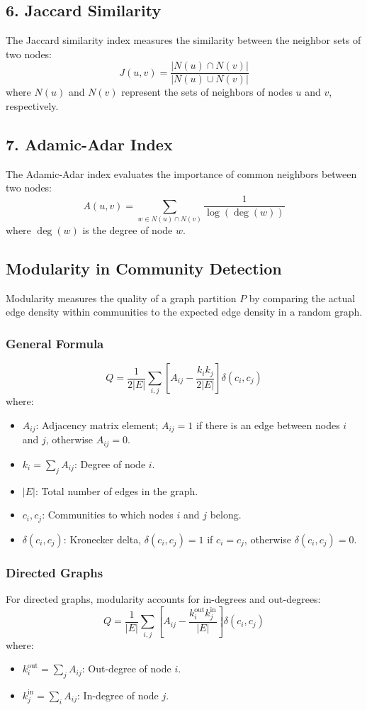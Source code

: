 \documentclass[12pt, a4paper,oneside]{book}
\begin{document}
\subsection*{6. Jaccard Similarity}
The Jaccard similarity index measures the similarity between the neighbor sets of two nodes:
\[
J(u, v) = \frac{|N(u) \cap N(v)|}{|N(u) \cup N(v)|}
\]
where \( N(u) \) and \( N(v) \) represent the sets of neighbors of nodes \( u \) and \( v \), respectively.

\subsection*{7. Adamic-Adar Index}
The Adamic-Adar index evaluates the importance of common neighbors between two nodes:
\[
A(u, v) = \sum_{w \in N(u) \cap N(v)} \frac{1}{\log(\deg(w))}
\]
where \( \deg(w) \) is the degree of node \( w \).

\subsection*{Modularity in Community Detection}

Modularity measures the quality of a graph partition \( P \) by comparing the actual edge density within communities to the expected edge density in a random graph.

\subsubsection*{General Formula}
\[
Q = \frac{1}{2|E|} \sum_{i, j} \left[ A_{ij} - \frac{k_i k_j}{2|E|} \right] \delta(c_i, c_j)
\]
where:
\begin{itemize}
    \item \( A_{ij} \): Adjacency matrix element; \( A_{ij} = 1 \) if there is an edge between nodes \( i \) and \( j \), otherwise \( A_{ij} = 0 \).
    \item \( k_i = \sum_j A_{ij} \): Degree of node \( i \).
    \item \( |E| \): Total number of edges in the graph.
    \item \( c_i, c_j \): Communities to which nodes \( i \) and \( j \) belong.
    \item \( \delta(c_i, c_j) \): Kronecker delta, \( \delta(c_i, c_j) = 1 \) if \( c_i = c_j \), otherwise \( \delta(c_i, c_j) = 0 \).
\end{itemize}

\subsubsection*{Directed Graphs}
For directed graphs, modularity accounts for in-degrees and out-degrees:
\[
Q = \frac{1}{|E|} \sum_{i, j} \left[ A_{ij} - \frac{k_i^{\text{out}} k_j^{\text{in}}}{|E|} \right] \delta(c_i, c_j)
\]
where:
\begin{itemize}
    \item \( k_i^{\text{out}} = \sum_j A_{ij} \): Out-degree of node \( i \).
    \item \( k_j^{\text{in}} = \sum_i A_{ij} \): In-degree of node \( j \).
\end{itemize}
\end{document}
